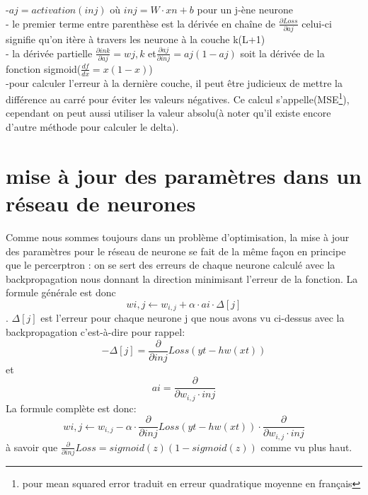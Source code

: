 \documentclass[openany,14pt,fleqn]{book} %
\begin{document}
-$aj = activation(inj)$ où $inj = W\cdot xn +b$ pour un j-ène neurone\\
- le premier terme entre parenthèse est la dérivée en chaîne de $\frac{\partial Loss}{\partial aj}$ celui-ci signifie qu'on itère à travers les neurone à la couche k(L+1)\\
- la dérivée partielle $\frac{\partial ink}{\partial aj} = wj,k$ et$\frac{\partial aj}{\partial inj} = aj(1-aj)$ soit la dérivée de la fonction sigmoid($\frac{df}{dx} = x(1-x)$)\\
-pour calculer l'erreur à la dernière couche, il peut être judicieux de mettre la différence au carré pour éviter les valeurs négatives. Ce calcul s'appelle(MSE\footnote{pour mean squared error traduit en erreur quadratique moyenne en français}), cependant on peut aussi utiliser la valeur absolu(à noter qu'il existe encore d'autre méthode pour calculer le delta).

\begin{figure}

\end{figure}
\section{mise à jour des paramètres dans un réseau de neurones}
Comme nous sommes toujours dans un problème d'optimisation, la mise à jour des paramètres pour le réseau de neurone se fait de la même façon en principe que le percerptron : on se sert des erreurs de chaque neurone calculé avec la backpropagation nous donnant la direction minimisant l'erreur de la fonction.
La formule générale est donc $$wi,j \leftarrow w_{i,j} +\alpha\cdot ai\cdot\Delta[j]$$.
$\Delta[j]$ est l'erreur pour chaque neurone j que nous avons vu ci-dessus avec la backpropagation c'est-à-dire pour rappel: $$ -\Delta[j] = \frac{\partial}{\partial inj}Loss(yt-hw(xt))$$ et $$ai = \frac{\partial}{\partial w_{i,j} \cdot inj}$$
La formule complète est donc: 
$$wi,j \leftarrow w_{i,j} -\alpha \cdot \frac{\partial}{\partial inj}Loss(yt-hw(xt)) \cdot \frac{\partial}{\partial w_{i,j} \cdot inj}$$
à savoir que $\frac{\partial}{\partial inj} Loss = sigmoid(z)(1-sigmoid(z))$  comme vu plus haut.
\end{document}
